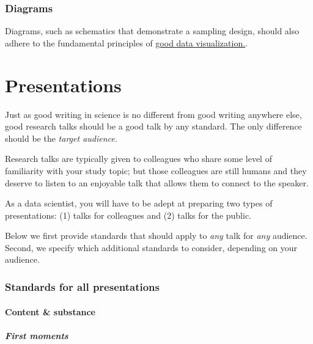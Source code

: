 \documentclass[
]{book}
\begin{document}
\hypertarget{diagrams}{%
\subsection*{Diagrams}\label{diagrams}}

Diagrams, such as schematics that demonstrate a sampling design, should also adhere to the fundamental principles of \protect\hyperlink{datavis}{good data visualization.}.

\hypertarget{presentations}{%
\chapter{Presentations}\label{presentations}}

Just as good writing in science is no different from good writing anywhere else, good research talks should be a good talk by any standard. The only difference should be the \emph{target audience.}

Research talks are typically given to colleagues who share some level of familiarity with your study topic; but those colleagues are still humans and they deserve to listen to an enjoyable talk that allows them to connect to the speaker.

As a data scientist, you will have to be adept at preparing two types of presentations: (1) talks for colleagues and (2) talks for the public.

Below we first provide standards that should apply to \emph{any} talk for \emph{any} audience. Second, we specify which additional standards to consider, depending on your audience.

\hypertarget{standards-for-all-presentations}{%
\subsection*{Standards for all presentations}\label{standards-for-all-presentations}}

\hypertarget{content-substance}{%
\subsubsection*{Content \& substance}\label{content-substance}}

\hypertarget{first-moments}{%
\paragraph{First moments}\label{first-moments}}
\end{document}
